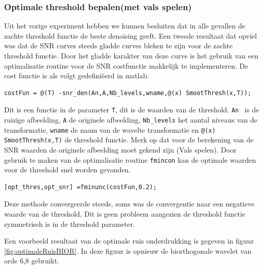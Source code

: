 \subsubsection{Optimale threshold bepalen(met vals spelen)}

Uit het vorige experiment hebben we kunnen besluiten dat in alle gevallen de zachte threshold functie de beste denoising geeft.
Een tweede resultaat dat opviel was dat de SNR curves steeds gladde curves bleken te zijn voor de zachte threshold functie.
Door het gladde karakter van deze curve is het gebruik van een optimalisatie routine voor de SNR costfunctie makkelijk te implementeren.
De cost functie is als volgt gedefini\"eerd in matlab.
\begin{verbatim}
costFun = @(T) -snr_den(An,A,Nb_levels,wname,@(x) SmootThresh(x,T));
\end{verbatim}
Dit is een functie in de parameter \verb|T|, dit is de waarden van de threshold.
\verb|An | is de ruizige afbeelding, \verb|A| de originele afbeelding, \verb|Nb_levels| het aantal niveaus van de transformatie, \verb|wname| de naam van de wavelte transformatie en \verb|@(x) SmootThresh(x,T)| de threshold functie.
Merk op dat voor de berekening van de SNR waarden de originele afbeelding moet gekend zijn (Vals spelen).
Door gebruik te maken van de optimalisatie routine \verb|fmincon| kan de optimale waarden voor de threshold snel worden gevonden.
\begin{verbatim}
[opt_thres,opt_snr] =fminunc(costFun,0.2);
\end{verbatim}
Deze methode convergeerde steeds, soms was de convergentie naar een negatieve waarde van de threshold.
Dit is geen probleem aangezien de threshold functie symmetrisch is in de threshold parameter.

Een voorbeeld resultaat van de optimale ruis onderdrukking is gegeven in figuur \ref{fig:optimaleRuisBIOR}.
In deze figuur is opnieuw de biorthogonale wavelet van orde 6,8 gebruikt.


